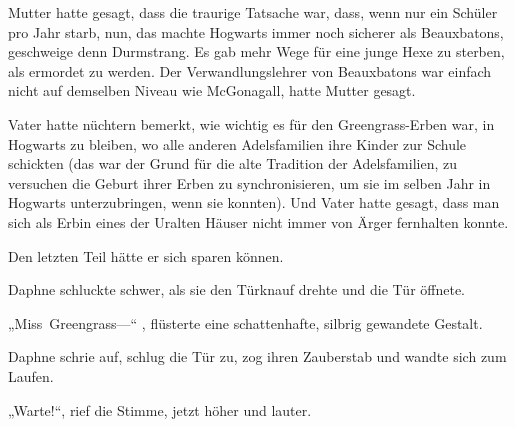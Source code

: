 Mutter hatte gesagt, dass die traurige Tatsache war, dass, wenn nur ein Schüler pro Jahr starb, nun, das machte Hogwarts immer noch sicherer als Beauxbatons, geschweige denn Durmstrang. Es gab mehr Wege für eine junge Hexe zu sterben, als ermordet zu werden. Der Verwandlungslehrer von Beauxbatons war einfach nicht auf demselben Niveau wie McGonagall, hatte Mutter gesagt.

Vater hatte nüchtern bemerkt, wie wichtig es für den Greengrass-Erben war, in Hogwarts zu bleiben, wo alle anderen Adelsfamilien ihre Kinder zur Schule schickten (das war der Grund für die alte Tradition der Adelsfamilien, zu versuchen die Geburt ihrer Erben zu synchronisieren, um sie im selben Jahr in Hogwarts unterzubringen, wenn sie konnten). Und Vater hatte gesagt, dass man sich als Erbin eines der Uralten Häuser nicht immer von Ärger fernhalten konnte.

Den letzten Teil hätte er sich sparen können.

Daphne schluckte schwer, als sie den Türknauf drehte und die Tür öffnete.

„Miss~Greengrass—“ , flüsterte eine schattenhafte, silbrig gewandete Gestalt.

Daphne schrie auf, schlug die Tür zu, zog ihren Zauberstab und wandte sich zum Laufen.

„Warte!“, rief die Stimme, jetzt höher und lauter.


